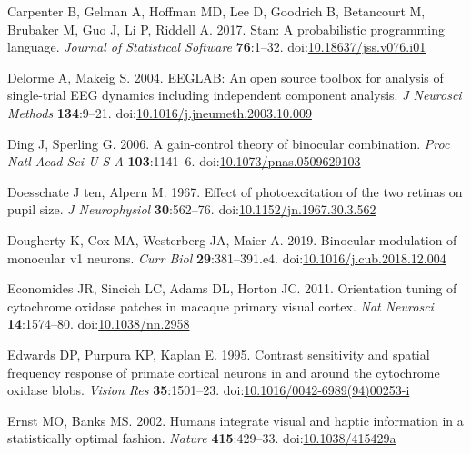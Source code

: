 \documentclass[
]{article}
\begin{document}
\leavevmode\hypertarget{ref-Carpenter2017}{}%
Carpenter B, Gelman A, Hoffman MD, Lee D, Goodrich B, Betancourt M, Brubaker M, Guo J, Li P, Riddell A. 2017. Stan: A probabilistic programming language. \emph{Journal of Statistical Software} \textbf{76}:1--32. doi:\href{https://doi.org/10.18637/jss.v076.i01}{10.18637/jss.v076.i01}

\leavevmode\hypertarget{ref-Delorme2004}{}%
Delorme A, Makeig S. 2004. EEGLAB: An open source toolbox for analysis of single-trial EEG dynamics including independent component analysis. \emph{J Neurosci Methods} \textbf{134}:9--21. doi:\href{https://doi.org/10.1016/j.jneumeth.2003.10.009}{10.1016/j.jneumeth.2003.10.009}

\leavevmode\hypertarget{ref-Ding2006}{}%
Ding J, Sperling G. 2006. A gain-control theory of binocular combination. \emph{Proc Natl Acad Sci U S A} \textbf{103}:1141--6. doi:\href{https://doi.org/10.1073/pnas.0509629103}{10.1073/pnas.0509629103}

\leavevmode\hypertarget{ref-Doesschate1967}{}%
Doesschate J ten, Alpern M. 1967. Effect of photoexcitation of the two retinas on pupil size. \emph{J Neurophysiol} \textbf{30}:562--76. doi:\href{https://doi.org/10.1152/jn.1967.30.3.562}{10.1152/jn.1967.30.3.562}

\leavevmode\hypertarget{ref-Dougherty2019}{}%
Dougherty K, Cox MA, Westerberg JA, Maier A. 2019. Binocular modulation of monocular v1 neurons. \emph{Curr Biol} \textbf{29}:381--391.e4. doi:\href{https://doi.org/10.1016/j.cub.2018.12.004}{10.1016/j.cub.2018.12.004}

\leavevmode\hypertarget{ref-Economides2011}{}%
Economides JR, Sincich LC, Adams DL, Horton JC. 2011. Orientation tuning of cytochrome oxidase patches in macaque primary visual cortex. \emph{Nat Neurosci} \textbf{14}:1574--80. doi:\href{https://doi.org/10.1038/nn.2958}{10.1038/nn.2958}

\leavevmode\hypertarget{ref-Edwards1995}{}%
Edwards DP, Purpura KP, Kaplan E. 1995. Contrast sensitivity and spatial frequency response of primate cortical neurons in and around the cytochrome oxidase blobs. \emph{Vision Res} \textbf{35}:1501--23. doi:\href{https://doi.org/10.1016/0042-6989(94)00253-i}{10.1016/0042-6989(94)00253-i}

\leavevmode\hypertarget{ref-Ernst2002}{}%
Ernst MO, Banks MS. 2002. Humans integrate visual and haptic information in a statistically optimal fashion. \emph{Nature} \textbf{415}:429--33. doi:\href{https://doi.org/10.1038/415429a}{10.1038/415429a}
\end{document}
